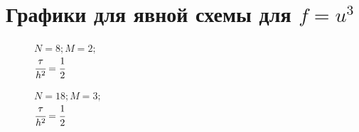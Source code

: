 \documentclass[12pt]{extarticle}
\numberwithin{equation}{section}
\begin{document}
\section{Графики для явной схемы для $f=u^3$}
\begin{figure}[H]
\begin{minipage}[h]{0.43\linewidth}
 $N=8; M=2;$\\$\cfrac{\tau}{h^2} = \cfrac{1}{2}$ \\
\end{minipage}
\hfill
\begin{minipage}[h]{0.43\linewidth}
 $N=18; M=3;$\\$ \cfrac{\tau}{h^2} = \cfrac{1}{2}$
\end{minipage}


\end{figure}
\end{document}
